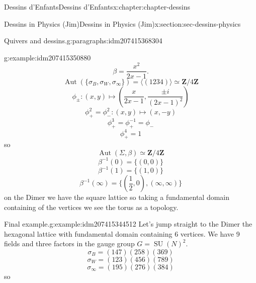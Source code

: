 \documentclass[oneside,10pt,]{book}
\numberwithin{equation}{section}
\newcommand{\inv}{^{-1}}
\newcommand{\ZZ}{\mathbf{Z}}
\DeclareMathOperator{\Aut}{Aut}
\DeclareMathOperator{\specialunitary}{SU}
\begin{document}
\begin{chapterptx}{Dessins d'Enfants}{}{Dessins d'Enfants}{}{}{x:chapter:chapter-dessins}
\begin{sectionptx}{Dessins in Physics (Jim)}{}{Dessins in Physics (Jim)}{}{}{x:section:sec-dessins-physics}
\begin{paragraphs}{Quivers and dessins.}{g:paragraphs:idm207415368304}
\begin{example}{}{g:example:idm207415350880}
\begin{equation*}
\end{equation*}
%
\begin{equation*}
\beta = \frac{x^2}{2x-1}\text{.}
\end{equation*}
%
\begin{equation*}
\Aut(\{\sigma_B,\sigma_W, \sigma_\infty\}) = \langle (1234) \rangle \simeq \ZZ/4\ZZ
\end{equation*}
%
\begin{equation*}
\phi_\pm \colon (x,y) \mapsto \left(\frac{x}{2x -1},\frac{\pm i}{(2x-1)^2} \right)
\end{equation*}
%
\begin{equation*}
\phi_+^2 = \phi_-^2 \colon (x,y) \mapsto (x,-y)
\end{equation*}
%
\begin{equation*}
\phi_+^3 = \phi_+\inv = \phi_-
\end{equation*}
%
\begin{equation*}
\phi_+^4 = 1
\end{equation*}
so%
\begin{equation*}
\Aut(\Sigma, \beta) \simeq \ZZ/4\ZZ
\end{equation*}
%
\begin{equation*}
\beta\inv(0)= \{(0,0)\}
\end{equation*}
%
\begin{equation*}
\beta\inv(1)= \{(1,0)\}
\end{equation*}
%
\begin{equation*}
\beta\inv(\infty)= \{(\frac 12,0), (\infty,\infty)\}
\end{equation*}
on the Dimer we have the square lattice so taking a fundamental domain containing  of the vertices we see the torus as a topology.%
\end{example}
\begin{example}{Final example.}{g:example:idm207415344512}%
Let's jump straight to the Dimer the hexagonal lattice with fundamental domain containing 6 vertices. We have 9 fields and three factors in the gauge group \(G = \specialunitary (N)^2\).%
\begin{equation*}
\sigma_B = (147)(258)(369)
\end{equation*}
%
\begin{equation*}
\sigma_W = (123)(456)(789)
\end{equation*}
%
\begin{equation*}
\sigma_\infty = (195)(276)(384)
\end{equation*}
so%
\begin{equation*}

\end{equation*}
\end{example}
\end{paragraphs}
\end{sectionptx}
\end{chapterptx}
\end{document}
